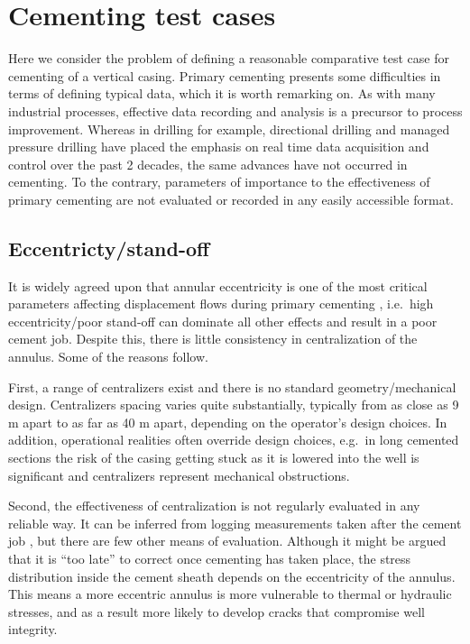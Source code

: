 \documentclass[review]{elsarticle}
\begin{document}
\section{Cementing test cases}
\label{sec:cementingtestcases}
Here we consider the problem of defining a reasonable comparative test case for cementing of a vertical casing. Primary cementing presents some difficulties in terms of defining typical data, which it is worth remarking on. As with many industrial processes, effective data recording and analysis is a precursor to process improvement. Whereas in drilling for example, directional drilling and managed pressure drilling have placed the emphasis on real time data acquisition and control over the past 2 decades, the same advances have not occurred in cementing. To the contrary, parameters of importance to the effectiveness of primary cementing are not evaluated or recorded in any easily accessible format.

\subsection{Eccentricty/stand-off}

It is widely agreed upon that annular eccentricity is one of the most critical parameters affecting displacement flows during primary cementing \citep{nelson06}, i.e.~high eccentricity/poor stand-off can dominate all other effects and result in a poor cement job. Despite this, there is little consistency in centralization of the annulus. Some of the reasons follow.

First, a range of centralizers exist and there is no standard geometry/mechanical design. Centralizers spacing varies quite substantially, typically from as close as 9 m apart to as far as 40 m apart, depending on the operator's design choices.
In addition, operational realities often override design choices, e.g.~in long cemented sections the risk of the casing getting stuck as it is lowered into the well is significant and centralizers represent mechanical obstructions.

Second, the effectiveness of centralization is not regularly evaluated in any reliable way. It can be inferred from logging measurements taken after the cement job \citep{Guillot2008}, but there are few other means of evaluation. Although it might be argued that it is ``too late'' to correct once cementing has taken place, the stress distribution inside the cement sheath depends on the eccentricity of the annulus. This means a more eccentric annulus is more vulnerable to thermal or hydraulic stresses, and as a result more likely to develop cracks that compromise well integrity.
\end{document}

